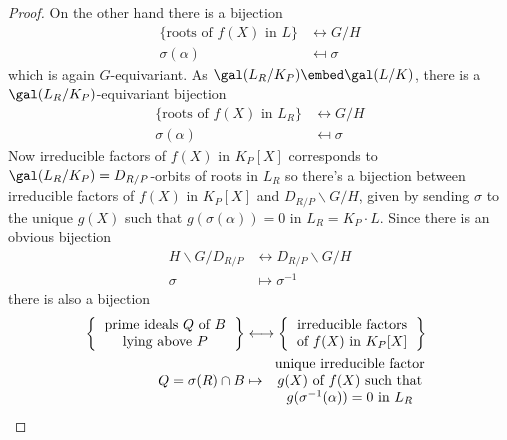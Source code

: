 \documentclass[a4paper]{article}
\begin{document}
\begin{proof}
  On the other hand there is a bijection
  \begin{align*}
    \{\text{roots of \(f(X)\) in \(L\)}\} &\longleftrightarrow G/H \\
    \sigma(\alpha) &\mapsfrom \sigma
  \end{align*}
  which is again \(G\)-equivariant. As \(\gal(L_R/K_P) \embed \gal(L/K)\), there is a \(\gal(L_R/K_P)\)-equivariant bijection
  \begin{align*}
    \{\text{roots of \(f(X)\) in \(L_R\)}\} &\longleftrightarrow G/H \\
    \sigma(\alpha) &\mapsfrom \sigma
  \end{align*}
  Now irreducible factors of \(f(X)\) in \(K_P[X]\) corresponds to \(\gal(L_R/K_P) = D_{R/P}\)-orbits of roots in \(L_R\) so there's a bijection between irreducible factors of \(f(X)\) in \(K_P[X]\) and \(D_{R/P} \backslash G/H\), given by sending \(\sigma\) to the unique \(g(X)\) such that \(g(\sigma(\alpha)) = 0\) in \(L_R = K_P \cdot L\). Since there is an obvious bijection
  \begin{align*}
    H \backslash G /D_{R/P} &\longleftrightarrow D_{R/P} \backslash G/H \\
    \sigma &\mapsto \sigma^{-1}
  \end{align*}
  there is also a bijection
  \begin{align*}
    \left\{
    \begin{tabular}{c}
      prime ideals \(Q\) of \(B\) \\
      lying above \(P\)
    \end{tabular}
    \right\}
    &\longleftrightarrow
      \left\{
      \begin{tabular}{c}
        irreducible factors \\
        of \(f(X)\) in \(K_P[X]\)
      \end{tabular}
    \right\}
    \\
    Q = \sigma(R) \cap B &\mapsto
                           \begin{tabular}{c}
                             unique irreducible factor \\
                             \(g(X)\) of \(f(X)\) such that \\
                             \(g(\sigma^{-1}(\alpha)) = 0\) in \(L_R\)
                           \end{tabular}
  \end{align*}

\end{proof}
\end{document}
